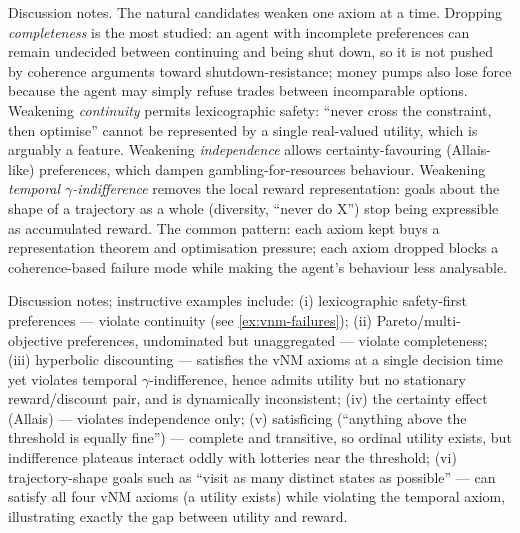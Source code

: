 \documentclass[11pt]{article}
\begin{document}
\begin{solution}
Discussion notes. The natural candidates weaken one axiom at a time.
Dropping \emph{completeness} is the most studied: an agent with incomplete
preferences can remain undecided between continuing and being shut down, so
it is not pushed by coherence arguments toward shutdown-resistance; money
pumps also lose force because the agent may simply refuse trades between
incomparable options. Weakening \emph{continuity} permits lexicographic
safety: ``never cross the constraint, then optimise'' cannot be represented
by a single real-valued utility, which is arguably a feature. Weakening
\emph{independence} allows certainty-favouring (Allais-like) preferences,
which dampen gambling-for-resources behaviour. Weakening \emph{temporal
$\gamma$-indifference} removes the local reward representation: goals about
the shape of a trajectory as a whole (diversity, ``never do X'') stop being
expressible as accumulated reward. The common pattern: each axiom kept buys
a representation theorem and optimisation pressure; each axiom dropped
blocks a coherence-based failure mode while making the agent's behaviour
less analysable.
\end{solution}

\begin{solution}
Discussion notes; instructive examples include: (i) lexicographic
safety-first preferences — violate continuity (see \cref{ex:vnm-failures});
(ii) Pareto/multi-objective preferences, undominated but unaggregated —
violate completeness; (iii) hyperbolic discounting — satisfies the vNM
axioms at a single decision time yet violates temporal
$\gamma$-indifference, hence admits utility but no stationary
reward/discount pair, and is dynamically inconsistent; (iv) the certainty
effect (Allais) — violates independence only; (v) satisficing (``anything
above the threshold is equally fine'') — complete and transitive, so ordinal
utility exists, but indifference plateaus interact oddly with lotteries near
the threshold; (vi) trajectory-shape goals such as ``visit as many distinct
states as possible'' — can satisfy all four vNM axioms (a utility exists)
while violating the temporal axiom, illustrating exactly the gap between
utility and reward.
\end{solution}
\end{document}
